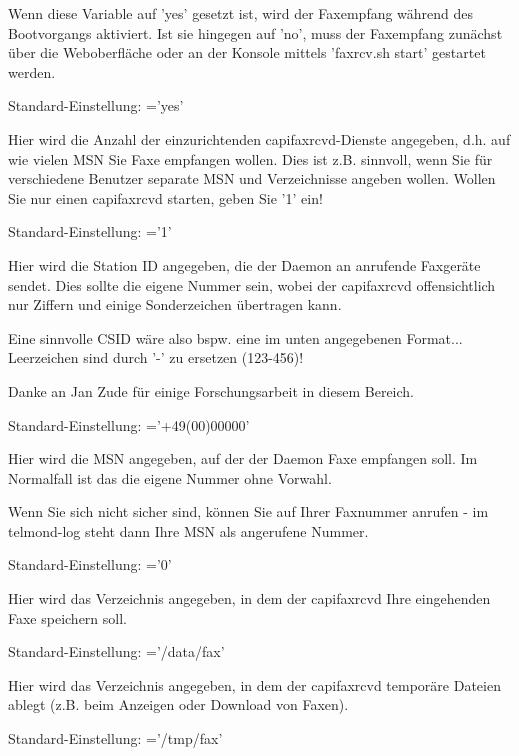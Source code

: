 \begin{description}

    {Wenn diese Variable auf 'yes' gesetzt ist, wird der Faxempfang während
    des Bootvorgangs aktiviert. Ist sie hingegen auf 'no', muss der Faxempfang
    zunächst über die Weboberfläche oder an der Konsole mittels
    'faxrcv.sh start' gestartet werden.

        Standard-Einstellung: ='yes'}


    {Hier wird die Anzahl der einzurichtenden capifaxrcvd-Dienste
    angegeben, d.h. auf wie vielen MSN Sie Faxe empfangen wollen.
    Dies ist z.B. sinnvoll, wenn Sie für verschiedene Benutzer
    separate MSN und Verzeichnisse angeben wollen. Wollen Sie nur
    einen capifaxrcvd starten, geben Sie '1' ein!

        Standard-Einstellung: ='1'}


    {Hier wird die \dq{}Station ID\dq{} angegeben, die der Daemon an anrufende
    Faxgeräte sendet. Dies sollte die eigene Nummer sein, wobei der
    capifaxrcvd offensichtlich nur Ziffern und einige Sonderzeichen
    übertragen kann.

    Eine sinnvolle CSID wäre also bspw. eine im unten angegebenen Format...
    Leerzeichen sind durch '-' zu ersetzen (123-456)!

    Danke an Jan Zude für einige \dq{}Forschungsarbeit\dq{} in diesem Bereich.

        Standard-Einstellung: ='+49(00)00000'}


    {Hier wird die MSN angegeben, auf der der Daemon Faxe empfangen soll.
    Im Normalfall ist das die eigene Nummer ohne Vorwahl.

     Wenn Sie sich nicht sicher sind, können Sie auf Ihrer
    Faxnummer anrufen - im telmond-log steht dann Ihre MSN als angerufene
    Nummer.

        Standard-Einstellung: ='0'}


    {Hier wird das Verzeichnis angegeben, in dem der capifaxrcvd Ihre
    eingehenden Faxe speichern soll.

        Standard-Einstellung:
            ='/data/fax'}


    {Hier wird das Verzeichnis angegeben, in dem der capifaxrcvd temporäre 
	Dateien ablegt (z.B. beim Anzeigen oder Download von Faxen).

        Standard-Einstellung:
            ='/tmp/fax'}

\end {description}

